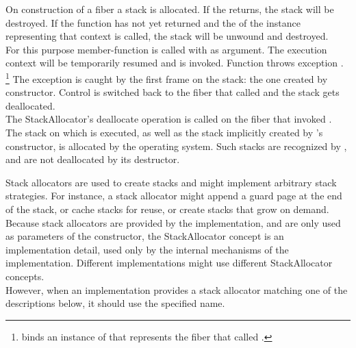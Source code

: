 \label{destruction}

On construction of a fiber a stack is allocated. If the \entryfn returns, the
stack will be destroyed. If the function has not yet returned and the
 of the \fiber instance representing that context is called,
the stack will be unwound and destroyed.\\

For this purpose member-function \resumewith is called with \unwindfib as
argument. The execution context will be temporarily resumed and \unwindfib is
invoked. Function \unwindfib throws exception \unwindex.
\footnote{\unwindex binds an instance of \fiber that represents the fiber that
called \resumewith.}
The exception is caught by the first frame on the stack: the one created by
constructor. Control is switched back to the fiber that called \dtor and the
stack gets deallocated.\\

The StackAllocator's deallocate operation is called on the fiber that invoked
\dtor.\\

The stack on which  is executed, as well as the stack implicitly
created by 's constructor, is allocated by the operating
system. Such stacks are recognized by \fiber, and are not deallocated by its
destructor.


\label{stackalloc}

Stack allocators are used to create stacks and might implement arbitrary stack
strategies. For instance, a stack allocator might append a guard page at the end
of the stack, or cache stacks for reuse, or create stacks that grow on demand.\\

Because stack allocators are provided by the implementation, and are only used
as parameters of the constructor, the StackAllocator concept is an
implementation detail, used only by the internal mechanisms of the
implementation. Different implementations might use different StackAllocator
concepts.\\

However, when an implementation provides a stack allocator matching one of
the descriptions below, it should use the specified name.\\

